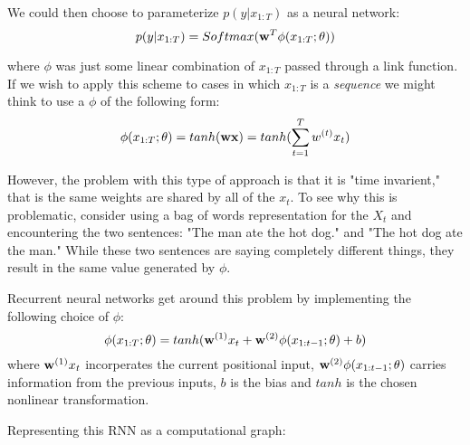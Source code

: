 \documentclass{article}
\begin{document}
We could then choose to parameterize $p(y|x_{1:T})$ as a neural network:
$$p(y|x_{1:T}) = Softmax(\bold{w}^{T} \phi(x_{1:T} ; \theta))$$

where $\phi$ was just some linear combination of $x_{1:T}$ passed through a link function. If we wish to apply this scheme to cases in which $x_{1:T}$ is a \textit{sequence} we might think to use a $\phi$ of the following form:
$$\phi(x_{1:T} ; \theta) = tanh(\bold{w}\bold{x}) = tanh(\sum_{t=1}^{T} w^{(t)}x_{t})$$

However, the problem with this type of approach is that it is "time invarient," that is the same weights are shared by all of the $x_{t}$. To see why this is problematic, consider using a bag of words representation for the $X_{t}$ and encountering the two sentences: "The man ate the hot dog." and "The hot dog ate the man." While these two sentences are saying completely different things, they result in the same value generated by $\phi$.

Recurrent neural networks get around this problem by implementing the following choice of $\phi$:
$$\phi(x_{1:T} ; \theta) = tanh(\bold{w}^{(1)} x_{t} + \bold{w}^{(2)} \phi (x_{1:t-1}; \theta) + b)$$
where $\bold{w}^{(1)} x_{t}$ incorperates the current positional input, $\bold{w}^{(2)} \phi (x_{1:t-1}; \theta)$ carries information from the previous inputs, $b$ is the bias and $tanh$ is the chosen nonlinear transformation.

\smallskip

Representing this RNN as a computational graph:
\end{document}
